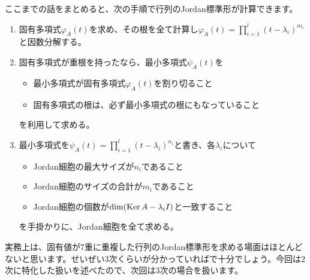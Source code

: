 ここまでの話をまとめると、次の手順で行列のJordan標準形が計算できます。
\begin{enumerate}
\item 固有多項式$\varphi_A(t)$を求め、その根を全て計算し$\varphi_A(t) = \prod_{i = 1}^l (t - \lambda_i)^{m_i}$と因数分解する。
\item 固有多項式が重根を持ったなら、最小多項式$\psi_A(t)$を
\begin{itemize}
\item 最小多項式が固有多項式$\varphi_A(t)$を割り切ること
\item 固有多項式の根は、必ず最小多項式の根にもなっていること
\end{itemize}
を利用して求める。
\item 最小多項式を$\psi_A(t) = \prod_{i = 1}^l (t - \lambda_i)^{n_i}$と書き、各$\lambda_i$について
\begin{itemize}
\item Jordan細胞の最大サイズが$n_i$であること
\item Jordan細胞のサイズの合計が$m_i$であること
\item Jordan細胞の個数が$\dim (\operatorname{Ker} A - \lambda_i I)$と一致すること
\end{itemize}
を手掛かりに、Jordan細胞を全て求める。
\end{enumerate}

実務上は、固有値が$7$重に重複した行列のJordan標準形を求める場面はほとんどないと思います。せいぜい$3$次くらいが分かっていればで十分でしょう。今回は$2$次に特化した扱いを述べたので、次回は$3$次の場合を扱います。

